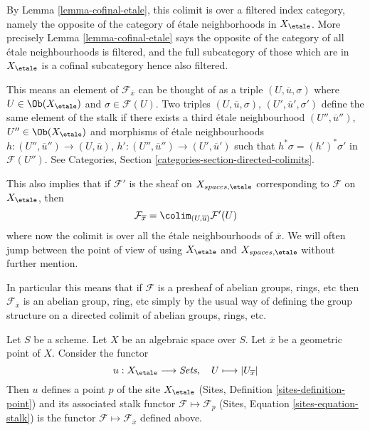 \noindent
By
Lemma \ref{lemma-cofinal-etale},
this colimit is over a filtered
index category, namely the opposite of the category of \'etale neighborhoods
in $X_\etale$. More precisely
Lemma \ref{lemma-cofinal-etale}
says the opposite of the category of all \'etale neighbourhoods is filtered,
and the full subcategory of those which are in $X_\etale$ is a cofinal
subcategory hence also filtered.

\medskip\noindent
This means an element of $\mathcal{F}_{\overline{x}}$ can be
thought of as a triple $(U, \overline{u}, \sigma)$ where
$U \in \Ob(X_\etale)$ and $\sigma \in \mathcal{F}(U)$.
Two triples $(U, \overline{u}, \sigma)$, $(U', \overline{u}', \sigma')$
define the same element of the stalk if there exists a third
\'etale neighbourhood
$(U'', \overline{u}'')$, $U'' \in \Ob(X_\etale)$
and morphisms of \'etale neighbourhoods
$h : (U'', \overline{u}'') \to (U, \overline{u})$,
$h' : (U'', \overline{u}'') \to (U', \overline{u}')$ such that
$h^*\sigma = (h')^*\sigma'$ in $\mathcal{F}(U'')$. See
Categories, Section \ref{categories-section-directed-colimits}.

\medskip\noindent
This also implies that if $\mathcal{F}'$ is the sheaf on
$X_{spaces, \etale}$ corresponding to $\mathcal{F}$ on
$X_\etale$, then
\begin{equation}
\label{equation-stalk-spaces-etale}
\mathcal{F}_{\overline{x}} = \colim_{(U, \overline{u})} \mathcal{F}'(U)
\end{equation}
where now the colimit is over all the \'etale neighbourhoods of $\overline{x}$.
We will often jump between the point of view of using $X_\etale$
and $X_{spaces, \etale}$ without further mention.

\medskip\noindent
In particular this means that if $\mathcal{F}$ is a presheaf of
abelian groups, rings, etc then $\mathcal{F}_{\overline{x}}$ is
an abelian group, ring, etc simply by the usual way of defining the
group structure on a directed colimit of abelian groups, rings, etc.

\begin{lemma}
\label{lemma-stalk-gives-point}
Let $S$ be a scheme.
Let $X$ be an algebraic space over $S$.
Let $\overline{x}$ be a geometric point of $X$.
Consider the functor
$$
u : X_\etale \longrightarrow \textit{Sets}, \quad
U \longmapsto |U_{\overline{x}}|
$$
Then $u$ defines a point $p$ of the site $X_\etale$
(Sites, Definition \ref{sites-definition-point})
and its associated stalk functor $\mathcal{F} \mapsto \mathcal{F}_p$
(Sites, Equation \ref{sites-equation-stalk})
is the functor $\mathcal{F} \mapsto \mathcal{F}_{\overline{x}}$
defined above.
\end{lemma}

